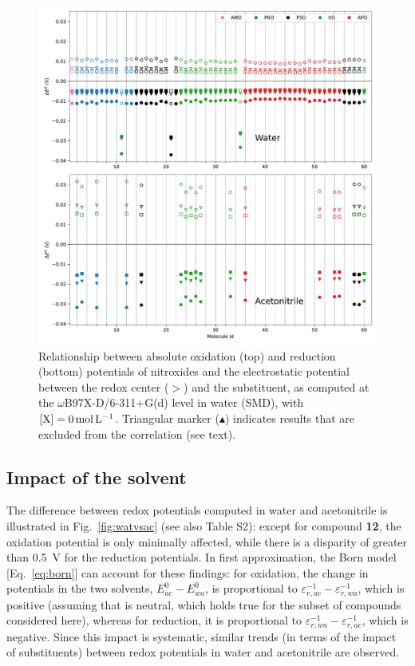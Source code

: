 \documentclass[review]{elsarticle}
\begin{document}
\begin{figure}[!h]
\centering
\includegraphics[width=\linewidth]{Figure8}
\caption{Relationship between absolute oxidation (top) and reduction (bottom) potentials of nitroxides and the electrostatic potential between the redox center ($>$) and the substituent, as computed at the $\omega$B97X-D/6-311+G(d) level in water (SMD), with $[\ce{X}]=\SI{0}{\mole\per\liter}$. Triangular marker ($\blacktriangle$) indicates results that are excluded from the correlation (see text).}
\label{fig:corr} 
\end{figure}

\clearpage

\subsection{Impact of the solvent}

The difference between redox potentials computed in water and acetonitrile is illustrated in Fig.~\ref{fig:watvsac} (see also Table S2): except for compound \textbf{12}, the oxidation potential is only minimally affected, while there is a disparity of greater than \SI{0.5}{\volt} for the reduction potentials. In first approximation, the Born model [Eq.~\eqref{eq:born}] can account for these findings: for oxidation, the change in potentials in the two solvents, $E^0_{ac} - E^0_{wa}$, is proportional to $\varepsilon_{r,ac}^{-1}-\varepsilon_{r,wa}^{-1}$, which is positive (assuming that  is neutral, which holds true for the subset of compounds considered here), whereas for reduction, it is proportional to $\varepsilon_{r,wa}^{-1}-\varepsilon_{r,ac}^{-1}$, which is negative. Since this impact is systematic, similar trends (in terms of the impact of substituents) between redox potentials in water and acetonitrile are observed.
\end{document}
